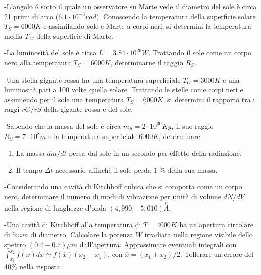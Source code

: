 \documentclass[12pt,twoside,a4]{article}
\begin{document}
\begin{esercizio}
	-L'angolo $\theta$ sotto il quale un osservatore su Marte vede il diametro del sole è circa 21 primi di arco ($6.1 \cdot 10^{-3} rad$). Conoscendo la temperatura della superficie solare $T_S = 6000 K$ e assimilando sole e Marte a corpi neri, si determini la temperatura media $T_M$ della superficie di Marte.
\end{esercizio}

\begin{esercizio}
	-La luminosità del sole è circa $L = 3.84 \cdot 10^{26} W$. Trattando il sole come un corpo nero alla temperatura $T_S = 6000 K$, determinarne il raggio $R_S$.
\end{esercizio}

\begin{esercizio}
	-Una stella gigante rossa ha una temperatura superficiale $T_G = 3000K$ e una luminosità pari a 100 volte quella solare. Trattando le stelle come corpi neri e assumendo per il sole una temperatura $T_S = 6000 K$, si determini il rapporto tra i raggi $rG/rS$ della gigante rossa e del sole.
\end{esercizio}

\begin{esercizio}
	-Sapendo che la massa del sole è circa $m_S = 2 \cdot 10^{30} Kg$, il suo raggio $R_S = 7 \cdot 10^8 m$ e la temperatura superficiale $6000 K$, determinare
	\begin{enumerate}[label=(\textit{\roman*})]
		\item La massa $dm/dt$ persa dal sole in un secondo per effetto della radiazione.
		\item Il tempo $\Delta t$ necessario affinchè il sole perda 1 \% della sua massa.
	\end{enumerate}
\end{esercizio}

\newpage
\begin{esercizio}
	-Considerando una cavità di Kirchhoff cubica che si comporta come un corpo nero, determinare il numero di modi di vibrazione per unità di volume $dN/dV$ nella regione di lunghezze d'onda $(4,990 - 5,010) \overset{o}{A}$.
\end{esercizio}

\begin{esercizio}
	-Una cavità di Kirchhoff alla temperatura di $T = 4000 K$ ha un'apertura circolare di $5 mm$ di diametro. Calcolare la potenza $W$ irradiata nella regione visibile dello
spettro $(0.4 - 0.7) \mu m$ dall'apertura. Approssimare eventuali integrali con $\int_{x_1}^{x_2}f(x)dx \simeq f( \overline x)(x_2-x_1)$, con $\overline x= (x_1+x_2)/2$. Tollerare un errore del 40\% nella risposta.
\end{esercizio}
\end{document}
